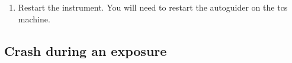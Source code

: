 \documentclass[11pt,fleqn,a4paper]{book}
\makeatletter
\def\menu#1#2{\texttt{#1}\ifx{}#2\else\@for\@x:=#2\do{$\rightarrow$\texttt{\@x}}\fi}
\def\wmenu#1#2{window menu \menu{#1}{#2}}
\def\mmenu#1#2{left-click mouse menu \menu{#1}{#2}}
\makeatother
\begin{document}
\begin{enumerate}
\begin{enumerate}
\begin{enumerate}
\begin{enumerate}
               \item Start SCCDs by typing \gls{wfinsStartSCCDS}
               \item Start TCCDs by typing \gls{wfinsStartTCCDS}
             \end{enumerate}
          \item Restart the instrument.\\
                Type \texttt{wfinsStartUp}.
          \item Restart the \gls{ag}
             \begin{enumerate}
                \item Go to screen \texttt{Telescope Control Software}. 
                \item Left-click on an empty space to open the menu \texttt{TCS User}.
                \item Use \wmenu{TCS User}{Stop autoguider}.
                \item Use \wmenu{TCS User}{Start autoguider}.
             \end{enumerate}
          \item Open missing windows on screens \texttt{Wide Field Imager}.
             \begin{enumerate}
                \item \gls{bob} with \mmenu{WFI User}{WFI,BOB (WFI)}.
                \item \gls{rtd} with \mmenu{WFI User}{WFI,WFI RTD}.
             \end{enumerate}
          \item Take a test bias.
        \end{enumerate}
      \item Restart the instrument.  You will need to restart the autoguider on the \gls{tcs} machine.
    \end{enumerate}
\end{enumerate}

\subsection{Crash during an exposure}
\end{document}
